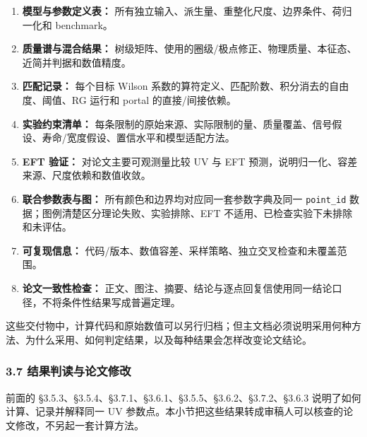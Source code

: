 \documentclass[
  chinese,
  UTF8]{ctexart}
\providecommand{\tightlist}{%
  \setlength{\itemsep}{0pt}\setlength{\parskip}{0pt}}
\begin{document}
\begin{enumerate}
\def\labelenumi{\arabic{enumi}.}
\tightlist
\item
  \textbf{模型与参数定义表：}
  所有独立输入、派生量、重整化尺度、边界条件、荷归一化和 benchmark。
\item
  \textbf{质量谱与混合结果：}
  树级矩阵、使用的圈级/极点修正、物理质量、本征态、近简并判据和数值精度。
\item
  \textbf{匹配记录：} 每个目标 Wilson
  系数的算符定义、匹配阶数、积分消去的自由度、阈值、RG 运行和 portal
  的直接/间接依赖。
\item
  \textbf{实验约束清单：}
  每条限制的原始来源、实际限制的量、质量覆盖、信号假设、寿命/宽度假设、置信水平和模型适配方法。
\item
  \textbf{EFT 验证：} 对论文主要可观测量比较 UV 与 EFT
  预测，说明归一化、容差来源、尺度依赖和数值收敛。
\item
  \textbf{联合参数表与图：} 所有颜色和边界均对应同一套参数字典及同一
  \texttt{point\_id} 数据；图例清楚区分理论失败、实验排除、EFT
  不适用、已检查实验下未排除和未评估。
\item
  \textbf{可复现信息：}
  代码/版本、数值容差、采样策略、独立交叉检查和未覆盖范围。
\item
  \textbf{论文一致性检查：}
  正文、图注、摘要、结论与逐点回复信使用同一结论口径，不将条件性结果写成普遍定理。
\end{enumerate}

这些交付物中，计算代码和原始数值可以另行归档；但主文档必须说明采用何种方法、为什么采用、如何判定结果，以及每种结果会怎样改变论文结论。

\subsubsection{3.7 结果判读与论文修改}\label{major-2-step-7}

前面的 §3.5.3、§3.5.4、§3.7.1、§3.6.1、§3.5.5、§3.6.2、§3.7.2、§3.6.3
说明了如何计算、记录并解释同一 UV
参数点。本小节把这些结果转成审稿人可以核查的论文修改，不另起一套计算方法。
\end{document}
